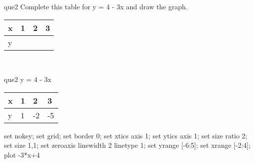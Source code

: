\documentclass[13.5pt, varwidth=true]{beamer}
\begin{document}
\begin{frame}[shrink=19,fragile]
	\begin{beamercolorbox}[rounded=true, left, shadow=true,wd=14.8cm]{que2}
		 Complete this table for y = 4 - 3x and draw the graph. \\[0.3cm] \renewcommand{\arraystretch}{1.2}\begin{tabular}{|C|C|C|C|} \hline x & 1 & 2 & 3 \\ \hline y & & & \\ \hline \end{tabular}\\[0.3cm]
	\end{beamercolorbox}
\end{frame}
\begin{frame}[shrink=19,fragile]
	\begin{beamercolorbox}[rounded=true, left, shadow=true,wd=14.8cm]{que2}
		y = 4 - 3x\renewcommand{\arraystretch}{1.2}\begin{tabular}{|C|C|C|C|} \hline x & 1 & 2 & 3 \\ \hline y & 1 & -2 & -5\\ \hline \end{tabular}\begin{gnuplot}[terminal=pdf] set nokey; set grid; set border 0; set xtics axis 1; set ytics axis 1; set size ratio 2; set size 1,1; set zeroaxis linewidth 2 linetype 1; set yrange [-6:5]; set xrange [-2:4]; plot -3*x+4 \end{gnuplot}
	\end{beamercolorbox}
\end{frame}
\end{document}
